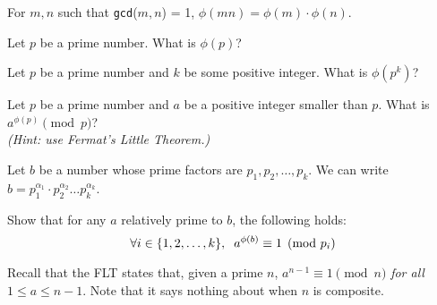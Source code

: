   For $m,n$ such that \texttt{gcd}($m,n$) = 1, $\phi(mn) = \phi(m) \cdot \phi(n)$.

  \begin{Parts}
  \Part
    Let $p$ be a prime number.
    What is $\phi(p)$?

    \Part
    Let $p$ be a prime number and $k$ be some positive integer.
    What is $\phi(p^k)$?


    \Part
    Let $p$ be a prime number and $a$ be a positive integer smaller than $p$.
    What is $a^{\phi(p)} \pmod{p}$?\\\emph{(Hint: use Fermat's Little Theorem.)}

    \Part
    Let $b$ be a number whose prime factors are $p_1,p_2,\hdots, p_k$.
    We can write $b = p_1^{\alpha_1}\cdot p_2^{\alpha_2} \hdots p_k^{\alpha_k}$.

    Show that for any $a$ relatively prime to $b$, the following holds:
    $$\forall i \in \{1,2,\hdots,k\}, \hspace{0.2cm} a^{\phi(b)} \equiv 1 \pmod{p_i}$$

  \end{Parts}



Recall that the FLT states that, given a prime $n$, $a^{n-1} \equiv 1 \pmod{n}$ \textit{for all $1 \leq a \leq n-1$}. Note that it says nothing about when $n$ is composite.

